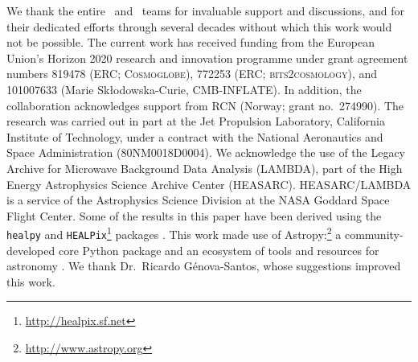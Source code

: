 \begin{acknowledgements}
  We thank the entire \Planck\ and \WMAP\ teams for invaluable support
  and discussions, and for their dedicated efforts through several
  decades without which this work would not be possible. The current
  work has received funding from the European Union’s Horizon 2020
  research and innovation programme under grant agreement numbers
  819478 (ERC; \textsc{Cosmoglobe}), 772253 (ERC;
  \textsc{bits2cosmology}), and 101007633 (Marie Skłodowska-Curie,
  \textsc{CMB-INFLATE}). In addition, the collaboration acknowledges
  support from RCN (Norway; grant no.\ 274990). The research was
  carried out in part at the Jet Propulsion Laboratory, California
  Institute of Technology, under a contract with the National
  Aeronautics and Space Administration (80NM0018D0004).  We
  acknowledge the use of the Legacy Archive for Microwave Background
  Data Analysis (LAMBDA), part of the High Energy Astrophysics Science
  Archive Center (HEASARC). HEASARC/LAMBDA is a service of the
  Astrophysics Science Division at the NASA Goddard Space Flight
  Center.  Some of the results in this paper have been derived using
  the \texttt{healpy} and
  \texttt{HEALPix}\footnote{\url{http://healpix.sf.net}} packages
  \citep{gorski2005, Zonca2019}.  This work made use of
  Astropy:\footnote{\url{http://www.astropy.org}} a
  community-developed core Python package and an ecosystem of tools
  and resources for astronomy \citep{astropy:2013, astropy:2018,
    astropy:2022}.
  We thank Dr.~Ricardo Génova-Santos, whose suggestions improved this work.
\end{acknowledgements}
